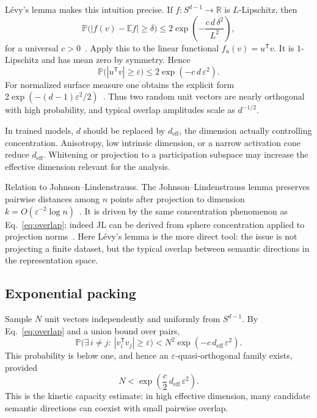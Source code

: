 \documentclass[
  aps,
  reprint,
  superscriptaddress,
  floatfix,
  nofootinbib,
  longbibliography
]{revtex4-2}
\newcommand{\R}{\mathbb{R}}
\newcommand{\E}{\mathbb{E}}
\newcommand{\Prob}{\mathbb{P}}
\newcommand{\Sph}[1]{S^{#1}}
\newcommand{\deff}{d_{\mathrm{eff}}}
\newcommand{\T}{^{\mathsf{T}}}
\begin{document}
L\'evy's lemma makes this intuition precise.  If $f:\Sph{d-1}\to\R$
is $L$-Lipschitz, then
%
\begin{equation}
\label{eq:levy}
\Prob\bigl(|f(v)-\E f|\ge\delta\bigr)
 \le
2\exp\!\left(-\frac{c\,d\,\delta^{2}}{L^{2}}\right),
\end{equation}
%
for a universal $c>0$~\cite{ledoux2001concentration,milman1986asymptotic}. Apply this to the
linear functional $f_u(v)=u\T v$. It is $1$-Lipschitz and has mean zero
by symmetry. Hence
%
\begin{equation}
\label{eq:overlap}
\Prob\bigl(|u\T v|\ge\varepsilon\bigr)
 \le 2\exp(-c\,d\,\varepsilon^{2}).
\end{equation}
%
For normalized surface measure one obtains the explicit form
$2\exp(-(d-1)\varepsilon^{2}/2)$~\cite{ledoux2001concentration}. Thus two random
unit vectors are nearly orthogonal with high probability, and typical
overlap amplitudes scale as $d^{-1/2}$.

In trained models, $d$ should be replaced by $\deff$, the dimension
actually controlling concentration. Anisotropy, low intrinsic
dimension, or a narrow activation cone reduce $\deff$. Whitening or
projection to a participation subspace may increase the effective
dimension relevant for the analysis.

{Relation to Johnson--Lindenstrauss.}
The Johnson--Lindenstrauss lemma preserves pairwise distances among
$n$ points after projection to dimension
$k=O(\varepsilon^{-2}\log n)$~\cite{johnson-1984}. It is driven by the
same concentration phenomenon as Eq.~\eqref{eq:overlap}; indeed JL can
be derived from sphere concentration applied to projection
norms~\cite{Dasgupta-2003}. Here L\'evy's lemma is the more direct tool:
the issue is not projecting a finite dataset, but the typical overlap
between semantic directions in the representation space.

\subsection{Exponential packing}
\label{sec:packing}

Sample $N$ unit vectors independently and uniformly from
$\Sph{d-1}$. By Eq.~\eqref{eq:overlap} and a union bound over pairs,
%
\begin{equation}
\label{eq:unionbound}
\Prob\bigl(\exists\,i\neq j:\ |v_i\T v_j|\ge\varepsilon\bigr)
 < N^{2}\exp(-c\,\deff\,\varepsilon^{2}).
\end{equation}
%
This probability is below one, and hence an
$\varepsilon$-quasi-orthogonal family exists, provided
%
\begin{equation}
\label{eq:packing}
N < \exp\!\left(\frac{c}{2}\,\deff\,\varepsilon^{2}\right).
\end{equation}
%
This is the kinetic capacity estimate: in high effective dimension,
many candidate semantic directions can coexist with small pairwise
overlap.
\end{document}
